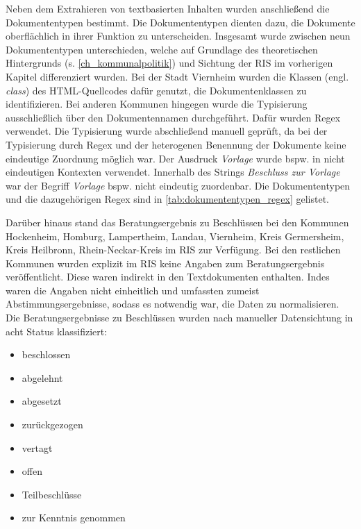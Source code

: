 Neben dem Extrahieren von textbasierten Inhalten wurden anschließend die Dokumententypen bestimmt. Die Dokumententypen dienten dazu, die Dokumente oberflächlich in ihrer Funktion zu unterscheiden. Insgesamt wurde zwischen neun Dokumententypen unterschieden, welche auf Grundlage des theoretischen Hintergrunds (s. \autoref{ch_kommunalpolitik}) und Sichtung der RIS im vorherigen Kapitel differenziert wurden. Bei der Stadt Viernheim wurden die Klassen (engl. \textit{class}) des HTML-Quellcodes dafür genutzt, die Dokumentenklassen zu identifizieren. Bei anderen Kommunen hingegen wurde die Typisierung ausschließlich über den Dokumentennamen durchgeführt. Dafür wurden Regex verwendet. Die Typisierung wurde abschließend manuell geprüft, da bei der Typisierung durch Regex und der heterogenen Benennung der Dokumente keine eindeutige Zuordnung möglich war. Der Ausdruck \textit{Vorlage} wurde bspw. in nicht eindeutigen Kontexten verwendet. Innerhalb des Strings \textit{Beschluss zur Vorlage} war der Begriff \textit{Vorlage} bspw. nicht eindeutig zuordenbar. Die Dokumententypen und die dazugehörigen Regex sind in \autoref{tab:dokumententypen_regex} gelistet.



Darüber hinaus stand das Beratungsergebnis zu Beschlüssen bei den Kommunen Hockenheim, Homburg, Lampertheim, Landau, Viernheim, Kreis Germersheim, Kreis Heilbronn, Rhein-Neckar-Kreis im RIS zur Verfügung. Bei den restlichen Kommunen wurden explizit im RIS keine Angaben zum Beratungsergebnis veröffentlicht. Diese waren indirekt in den Textdokumenten enthalten. Indes waren die Angaben nicht einheitlich und umfassten zumeist Abstimmungsergebnisse, sodass es notwendig war, die Daten zu normalisieren. Die Beratungsergebnisse zu Beschlüssen wurden nach manueller Datensichtung in acht Status klassifiziert:
\begin{multicols}{2}
    \begin{itemize}
        \item beschlossen
        \item abgelehnt
        \item abgesetzt
        \item zurückgezogen
        \item vertagt
        \item offen
        \item Teilbeschlüsse
        \item zur Kenntnis genommen
    \end{itemize}
\end{multicols}

